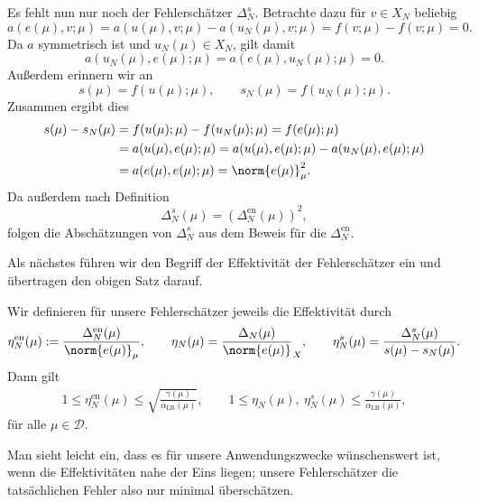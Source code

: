 \begin{Satz}
\begin{Beweis}
        Es fehlt nun nur noch der Fehlerschätzer $\Delta^s_N$. Betrachte dazu für $v \in X_N$ beliebig
        \begin{equation}
            a(e(\mu), v; \mu) = a(u(\mu), v; \mu) - a(u_N(\mu), v; \mu) = f(v; \mu) - f(v; \mu) = 0.
        \end{equation}
        Da $a$ symmetrisch ist und $u_N(\mu) \in X_N$, gilt damit
        \begin{equation}
            a(u_N(\mu), e(\mu); \mu) = a(e(\mu), u_N(\mu); \mu) = 0.
        \end{equation}
        Außerdem erinnern wir an
        \begin{equation}
            s(\mu) = f(u(\mu); \mu), \qquad s_N(\mu) = f(u_N(\mu); \mu).
        \end{equation}
        Zusammen ergibt dies
        \begin{align}
            s(\mu) - s_N(\mu) &= f(u(\mu); \mu) - f(u_N(\mu); \mu) = f(e(\mu); \mu) \\
            &= a(u(\mu), e(\mu); \mu) = a(u(\mu), e(\mu); \mu) - a(u_N(\mu), e(\mu); \mu)\\
            &= a(e(\mu), e(\mu); \mu) = \norm{e(\mu)}_{\mu}^2.
        \end{align}
        Da außerdem nach Definition
        \begin{equation}
            \Delta^s_N(\mu) = \left( \Delta^{\text{en}}_N(\mu) \right)^2,
        \end{equation}
        folgen die Abschätzungen von $\Delta^s_N$ aus dem Beweis für die $\Delta^\text{en}_N$.
    \end{Beweis}
\end{Satz}

Als nächstes führen wir den Begriff der Effektivität der Fehlerschätzer ein und übertragen den obigen Satz darauf.

\begin{Korollar}
    \label{korollar:effektivitaeten}
    Wir definieren für unsere Fehlerschätzer jeweils die Effektivität durch
    \begin{equation}
        \eta^{\text{en}}_N(\mu) := \frac{\Delta^{\text{en}}_N(\mu)}{\norm{e(\mu)}_{\mu}}
        , \qquad
        \eta_N(\mu) = \frac{\Delta_N(\mu)}{\norm{e(\mu)}}_X
        , \qquad
        \eta^{s}_N(\mu) = \frac{\Delta^s_N(\mu)}{s(\mu) - s_N(\mu)}.
    \end{equation}
    Dann gilt
    \begin{align}
        1 \leq \eta^{\text{en}}_N(\mu) \leq \sqrt{\frac{\gamma(\mu)}{\alpha_{\text{LB}}(\mu)}}, \qquad
        1 \leq \eta_N(\mu),~\eta^{s}_N(\mu) \leq \frac{\gamma(\mu)}{\alpha_{\text{LB}}(\mu)},
    \end{align}
    für alle $\mu \in \mathcal D$.
\end{Korollar}
Man sieht leicht ein, dass es für unsere Anwendungszwecke wünschenswert ist, wenn die Effektivitäten nahe der Eins liegen; unsere Fehlerschätzer die tatsächlichen Fehler also nur minimal überschätzen.

